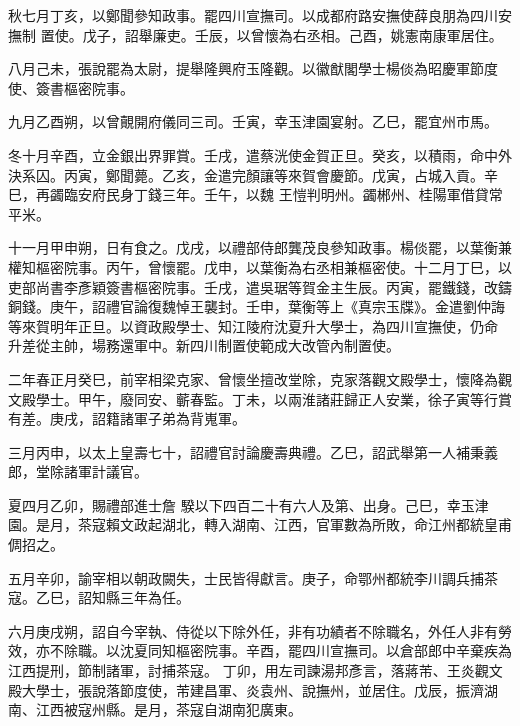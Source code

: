 \begin{pinyinscope}
 秋七月丁亥，以鄭聞參知政事。罷四川宣撫司。以成都府路安撫使薛良朋為四川安撫制
 置使。戊子，詔舉廉吏。壬辰，以曾懷為右丞相。己酉，姚憲南康軍居住。



 八月己未，張說罷為太尉，提舉隆興府玉隆觀。以徽猷閣學士楊倓為昭慶軍節度使、簽書樞密院事。



 九月乙酉朔，以曾覿開府儀同三司。壬寅，幸玉津園宴射。乙巳，罷宜州市馬。



 冬十月辛酉，立金銀出界罪賞。壬戌，遣蔡洸使金賀正旦。癸亥，以積雨，命中外決系囚。丙寅，鄭聞薨。乙亥，金遣完顏讓等來賀會慶節。戊寅，占城入貢。辛巳，再蠲臨安府民身丁錢三年。壬午，以魏
 王愷判明州。蠲郴州、桂陽軍借貸常平米。



 十一月甲申朔，日有食之。戊戌，以禮部侍郎龔茂良參知政事。楊倓罷，以葉衡兼權知樞密院事。丙午，曾懷罷。戊申，以葉衡為右丞相兼樞密使。十二月丁巳，以吏部尚書李彥穎簽書樞密院事。壬戌，遣吳琚等賀金主生辰。丙寅，罷鐵錢，改鑄銅錢。庚午，詔禮官論復魏悼王襲封。壬申，葉衡等上《真宗玉牒》。金遣劉仲誨等來賀明年正旦。以資政殿學士、知江陵府沈夏升大學士，為四川宣撫使，仍命
 升差從主帥，場務還軍中。新四川制置使範成大改管內制置使。



 二年春正月癸巳，前宰相梁克家、曾懷坐擅改堂除，克家落觀文殿學士，懷降為觀文殿學士。甲午，廢同安、蘄春監。丁未，以兩淮諸莊歸正人安業，徐子寅等行賞有差。庚戌，詔籍諸軍子弟為背嵬軍。



 三月丙申，以太上皇壽七十，詔禮官討論慶壽典禮。乙巳，詔武舉第一人補秉義郎，堂除諸軍計議官。



 夏四月乙卯，賜禮部進士詹
 騤以下四百二十有六人及第、出身。己巳，幸玉津園。是月，茶寇賴文政起湖北，轉入湖南、江西，官軍數為所敗，命江州都統皇甫倜招之。



 五月辛卯，諭宰相以朝政闕失，士民皆得獻言。庚子，命鄂州都統李川調兵捕茶寇。乙巳，詔知縣三年為任。



 六月庚戌朔，詔自今宰執、侍從以下除外任，非有功績者不除職名，外任人非有勞效，亦不除職。以沈夏同知樞密院事。辛酉，罷四川宣撫司。以倉部郎中辛棄疾為江西提刑，節制諸軍，討捕茶寇。
 丁卯，用左司諫湯邦彥言，落蔣芾、王炎觀文殿大學士，張說落節度使，芾建昌軍、炎袁州、說撫州，並居住。戊辰，振濟湖南、江西被寇州縣。是月，茶寇自湖南犯廣東。




\end{pinyinscope}
